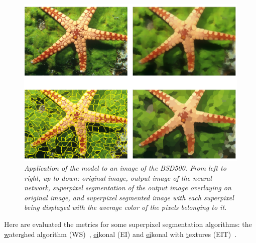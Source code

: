 \documentclass{article}
\begin{document}
        \begin{figure}[!htb]
            \centering
            \includegraphics[width=.8\linewidth]{pics/img_bsd_res2.png}
            \caption{\textit{Application of the model to an image of the BSD500. From left to right, up to down: original image, output image of the neural network, superpixel segmentation of the output image overlaying on original image, and superpixel segmented image with each superpixel being displayed with the average color of the pixels belonging to it.}}
        \end{figure}
        \cite{checkplacement}
        Here are evaluated the metrics for some superpixel segmentation algorithms: the \underline{w}ater\underline{s}hed algorithm (WS)~\cite{watershed1991}, \underline{ei}konal (EI) and \underline{ei}konal with \underline{t}extures (EIT)~\cite{figliuzzi2019}.
        \cite{todo:metrics}
\end{document}
